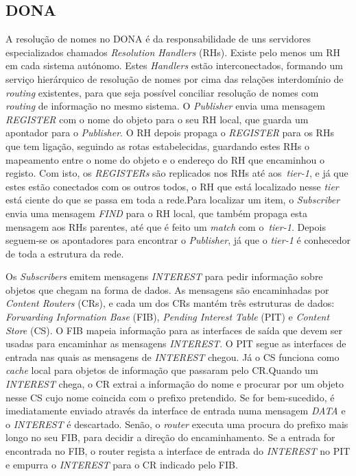 \documentclass[conference]{IEEEtran}
\begin{document}
\subsection{DONA}

A resolu\c{c}\~{a}o de nomes no DONA\cite{dona} \'{e} da responsabilidade de uns servidores especializados chamados \textit{Resolution Handlers} (RHs). Existe pelo menos um RH em cada sistema aut\'{o}nomo. Estes \textit{Handlers} est\~{a}o interconectados, formando um servi\c{c}o hier\'{a}rquico de resolu\c{c}\~{a}o de nomes por cima das rela\c{c}\~{o}es interdom\'{i}nio de \textit{routing} existentes, para que seja poss\'{i}vel conciliar resolu\c{c}\~{a}o de nomes com \textit{routing} de informa\c{c}\~{a}o no mesmo sistema. O \textit{Publisher} envia uma mensagem \textit{REGISTER} com o nome do objeto para o seu RH local, que guarda um apontador para o \textit{Publisher}. O RH depois propaga o \textit{REGISTER} para os RHs que tem liga\c{c}\~{a}o, seguindo as rotas estabelecidas, guardando estes RHs o mapeamento entre o nome do objeto e o endere\c{c}o do RH que encaminhou o registo. Com isto, os \textit{REGISTERs} s\~{a}o replicados nos RHs at\'{e} aos~\textit{tier-1}, e j\'{a} que estes est\~{a}o conectados com os outros todos, o RH que est\'{a} localizado nesse \textit{tier} est\'{a} ciente do que se passa em toda a rede.Para localizar um item, o \textit{Subscriber} envia uma mensagem \textit{FIND} para o RH local, que tamb\'{e}m propaga esta mensagem aos RHs parentes, at\'{e} que \'{e} feito um \textit{match} com o~\textit{tier-1}. Depois seguem-se os apontadores para encontrar o \textit{Publisher}, j\'{a} que o \textit{tier-1} \'{e} conhecedor de toda a estrutura da rede.



Os \textit{Subscribers} emitem mensagens \textit{INTEREST} para pedir informa\c{c}\~{a}o sobre objetos que chegam na forma de dados. As mensagens s\~{a}o encaminhadas por \textit{Content Routers} (CRs), e cada um dos CRs mant\'{e}m tr\^{e}s estruturas de dados: \textit{Forwarding Information Base} (FIB), \textit{Pending Interest Table} (PIT) e \textit{Content Store} (CS). O FIB mapeia informa\c{c}\~{a}o para as interfaces de sa\'{i}da que devem ser usadas para encaminhar as mensagens \textit{INTEREST}. O PIT segue as interfaces de entrada nas quais as mensagens de \textit{INTEREST} chegou. J\'{a} o CS funciona como \textit{cache} local para objetos de informa\c{c}\~{a}o que passaram pelo CR.Quando um \textit{INTEREST} chega, o CR extrai a informa\c{c}\~{a}o do nome e procurar por um objeto nesse CS cujo nome coincida com o prefixo pretendido. Se for bem-sucedido, \'{e} imediatamente enviado atrav\'{e}s da interface de entrada numa mensagem \textit{DATA} e o \textit{INTEREST} \'{e} descartado. Sen\~{a}o, o \textit{router} executa uma procura do prefixo mais longo no seu FIB, para decidir a dire\c{c}\~{a}o do encaminhamento. Se a entrada for encontrada no FIB, o router regista a interface de entrada do \textit{INTEREST} no PIT e empurra o \textit{INTEREST} para o CR indicado pelo FIB.
\end{document}
